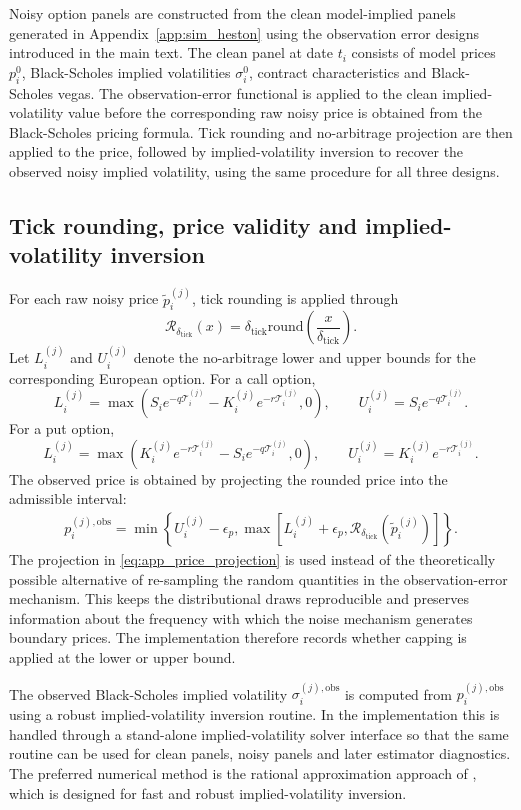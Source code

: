 \documentclass[11pt,a4paper,notitlepage]{article}
\numberwithin{equation}{section}
\begin{document}
Noisy option panels are constructed from the clean model-implied panels generated in Appendix~\ref{app:sim_heston} using the observation error designs introduced in the main text. The clean panel at date \(t_i\) consists of model prices \(p_i^0\), Black-Scholes implied volatilities \(\sigma_i^0\), contract characteristics and Black-Scholes vegas. The observation-error functional is applied to the clean implied-volatility value before the corresponding raw noisy price is obtained from the Black-Scholes pricing formula. Tick rounding and no-arbitrage projection are then applied to the price, followed by implied-volatility inversion to recover the observed noisy implied volatility, using the same procedure for all three designs.


\subsection{Tick rounding, price validity and implied-volatility inversion}
For each raw noisy price $\tilde p_i^{(j)}$, tick rounding is applied through
\[
\mathcal{R}_{\delta_{\mathrm{tick}}}(x)
=
\delta_{\mathrm{tick}}
\mathrm{round}\left(\frac{x}{\delta_{\mathrm{tick}}}\right).
\]
Let $L_i^{(j)}$ and $U_i^{(j)}$ denote the no-arbitrage lower and upper bounds for the corresponding European
option. For a call option,
\[
L_i^{(j)}=\max\left(S_ie^{-q\mathcal T_i^{(j)}}-K_i^{(j)}e^{-r\mathcal T_i^{(j)}},0\right),
\qquad
U_i^{(j)}=S_ie^{-q\mathcal T_i^{(j)}}.
\]
For a put option,
\[
L_i^{(j)}=\max\left(K_i^{(j)}e^{-r\mathcal T_i^{(j)}}-S_ie^{-q\mathcal T_i^{(j)}},0\right),
\qquad
U_i^{(j)}=K_i^{(j)}e^{-r\mathcal T_i^{(j)}}.
\]
The observed price is obtained by projecting the rounded price into the admissible interval:
\begin{align}
p_i^{(j),\mathrm{obs}}
=
\min\left\{
U_i^{(j)}-\epsilon_p,
\max\left[
L_i^{(j)}+\epsilon_p,
\mathcal{R}_{\delta_{\mathrm{tick}}}\left(\tilde p_i^{(j)}\right)
\right]
\right\}.
\label{eq:app_price_projection}
\end{align}
The projection in \eqref{eq:app_price_projection} is used instead of the theoretically possible alternative of re-sampling the random quantities in the observation-error mechanism. This keeps the distributional
draws reproducible and preserves information about the frequency with which the noise mechanism generates boundary
prices. The implementation therefore records whether capping is applied at the lower or upper bound.

The observed Black-Scholes implied volatility $\sigma_i^{(j),\mathrm{obs}}$ is computed from
$p_i^{(j),\mathrm{obs}}$ using a robust implied-volatility inversion routine. In the implementation this is handled
through a stand-alone implied-volatility solver interface so that the same routine can be used for clean panels,
noisy panels and later estimator diagnostics. The preferred numerical method is the rational approximation
approach of \citet{jaeckel2015lets}, which is designed for fast and robust implied-volatility inversion.
\end{document}
